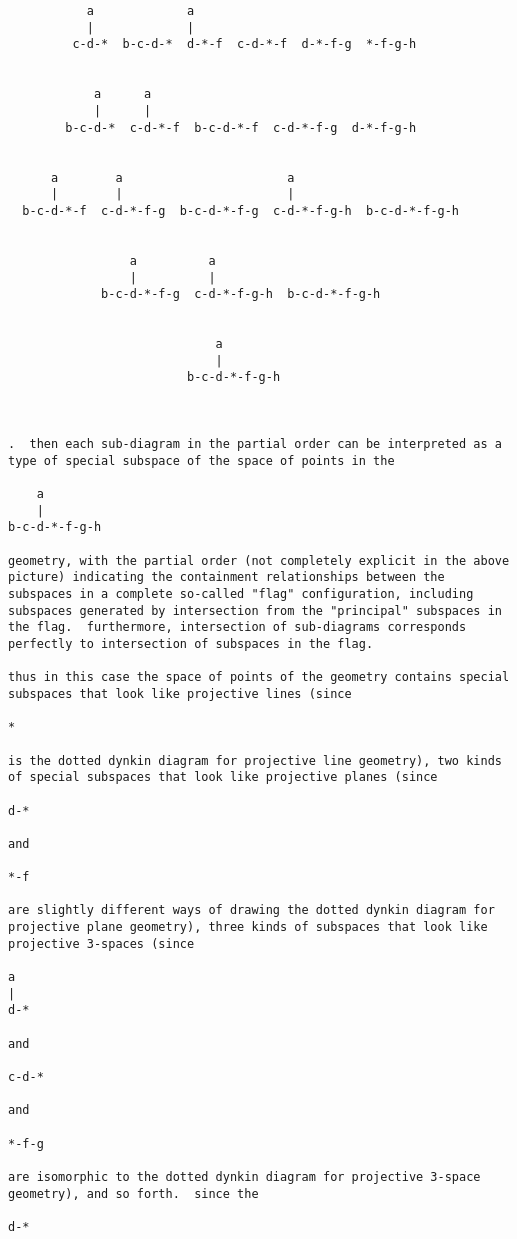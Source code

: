 \begin{verbatim}
           a             a
           |             |
         c-d-*  b-c-d-*  d-*-f  c-d-*-f  d-*-f-g  *-f-g-h


            a      a
            |      |
        b-c-d-*  c-d-*-f  b-c-d-*-f  c-d-*-f-g  d-*-f-g-h


      a        a                       a
      |        |                       |
  b-c-d-*-f  c-d-*-f-g  b-c-d-*-f-g  c-d-*-f-g-h  b-c-d-*-f-g-h


                 a          a
                 |          |
             b-c-d-*-f-g  c-d-*-f-g-h  b-c-d-*-f-g-h


                             a
                             |
                         b-c-d-*-f-g-h



.  then each sub-diagram in the partial order can be interpreted as a
type of special subspace of the space of points in the

    a
    |
b-c-d-*-f-g-h

geometry, with the partial order (not completely explicit in the above
picture) indicating the containment relationships between the
subspaces in a complete so-called "flag" configuration, including
subspaces generated by intersection from the "principal" subspaces in
the flag.  furthermore, intersection of sub-diagrams corresponds
perfectly to intersection of subspaces in the flag.

thus in this case the space of points of the geometry contains special
subspaces that look like projective lines (since

*

is the dotted dynkin diagram for projective line geometry), two kinds
of special subspaces that look like projective planes (since

d-*

and

*-f

are slightly different ways of drawing the dotted dynkin diagram for
projective plane geometry), three kinds of subspaces that look like 
projective 3-spaces (since

a
|
d-*

and

c-d-*

and

*-f-g

are isomorphic to the dotted dynkin diagram for projective 3-space
geometry), and so forth.  since the

d-*


\end{verbatim}
